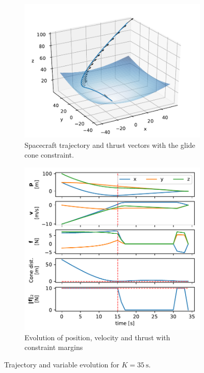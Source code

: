 \documentclass[12pt, letterpaper]{article}
\begin{document}
\begin{figure}[H]
  \begin{subfigure}[b]{0.5\textwidth}
    \includegraphics[width=\textwidth]{traj.pdf}
    \vspace{0.5cm}
    \caption{Spacecraft trajectory and thrust vectors with the glide cone constraint.}
    \label{fig:trajectory}
  \end{subfigure}
  \begin{subfigure}[b]{0.5\textwidth}
    \includegraphics[width=\textwidth]{variables.pdf}
    \caption{Evolution of position, velocity and thrust with constraint margins}
    \label{fig:variables}
  \end{subfigure}
  \caption{Trajectory and variable evolution for $K=\SI{35}{\second}$.}
  \label{fig:trandandvariables}
\end{figure}
\end{document}
